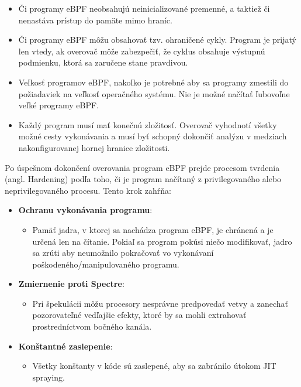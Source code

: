 \begin{itemize}
    \item Či programy eBPF neobsahujú neinicializované premenné, a taktiež či nenastáva prístup do pamäte mimo hraníc.
    \item Či programy eBPF môžu obsahovať tzv. ohraničené cykly. Program je prijatý len vtedy, ak overovač môže zabezpečiť, 
    že cyklus obsahuje výstupnú podmienku, ktorá sa zaručene stane pravdivou.
    \item Veľkosť programov eBPF, nakoľko je potrebné aby sa programy zmestili do požiadaviek na veľkosť operačného systému. 
    Nie je možné načítať ľubovoľne veľké programy eBPF.
    \item Každý program musí mať konečnú zložitosť. Overovač vyhodnotí všetky možné cesty vykonávania a musí byť schopný dokončiť analýzu 
    v medziach nakonfigurovanej hornej hranice zložitosti.
\end{itemize}

Po úspešnom dokončení overovania program eBPF prejde procesom tvrdenia (angl. Hardening) podľa toho, či je program načítaný z 
privilegovaného alebo neprivilegovaného procesu. 
Tento krok zahŕňa:
\begin{itemize}
    \item \textbf{Ochranu vykonávania programu}: 
        \begin{itemize}
            \item Pamäť jadra, v ktorej sa nachádza program eBPF, je chránená a je určená len na čítanie. 
            Pokiaľ sa program pokúsi niečo modifikovať, jadro sa zrúti aby neumožnilo pokračovať vo vykonávaní poškodeného/manipulovaného programu.
        \end{itemize}
    \item \textbf{Zmiernenie proti Spectre}: 
        \begin{itemize}
            \item Pri špekulácii môžu procesory nesprávne predpovedať vetvy a zanechať pozorovateľné vedľajšie efekty, 
            ktoré by sa mohli extrahovať prostredníctvom bočného kanála.
        \end{itemize}
    \item \textbf{Konštantné zaslepenie}: 
        \begin{itemize}
            \item Všetky konštanty v kóde sú zaslepené, aby sa zabránilo útokom JIT spraying.
        \end{itemize}
\end{itemize}

